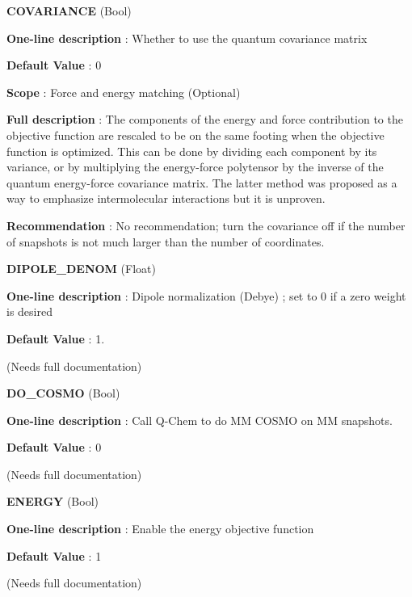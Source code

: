 \begin{DoxyItemize}
\item {\bfseries  C\-O\-V\-A\-R\-I\-A\-N\-C\-E } (Bool) \par
{\bfseries  One-\/line description }\-: Whether to use the quantum covariance matrix \par
{\bfseries  Default Value }\-: 0 \par
{\bfseries  Scope }\-: Force and energy matching (Optional) \par
{\bfseries  Full description }\-: The components of the energy and force contribution to the objective function are rescaled to be on the same footing when the objective function is optimized. This can be done by dividing each component by its variance, or by multiplying the energy-\/force polytensor by the inverse of the quantum energy-\/force covariance matrix. The latter method was proposed as a way to emphasize intermolecular interactions but it is unproven. \par
{\bfseries  Recommendation }\-: No recommendation; turn the covariance off if the number of snapshots is not much larger than the number of coordinates.\end{DoxyItemize}
\begin{DoxyItemize}
\item {\bfseries  D\-I\-P\-O\-L\-E\-\_\-\-D\-E\-N\-O\-M } (Float) \par
{\bfseries  One-\/line description }\-: Dipole normalization (Debye) ; set to 0 if a zero weight is desired \par
{\bfseries  Default Value }\-: 1. \par
(Needs full documentation)\end{DoxyItemize}
\begin{DoxyItemize}
\item {\bfseries  D\-O\-\_\-\-C\-O\-S\-M\-O } (Bool) \par
{\bfseries  One-\/line description }\-: Call Q-\/\-Chem to do M\-M C\-O\-S\-M\-O on M\-M snapshots. \par
{\bfseries  Default Value }\-: 0 \par
(Needs full documentation)\end{DoxyItemize}
\begin{DoxyItemize}
\item {\bfseries  E\-N\-E\-R\-G\-Y } (Bool) \par
{\bfseries  One-\/line description }\-: Enable the energy objective function \par
{\bfseries  Default Value }\-: 1 \par
(Needs full documentation)\end{DoxyItemize}
